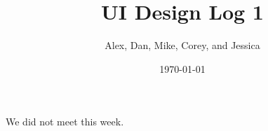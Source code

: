 \documentclass{article}
\title{UI Design Log 1}
\author{Alex, Dan, Mike, Corey, and Jessica}
\date{\today}
\begin{document}
\maketitle
We did not meet this week.
\end{document}
